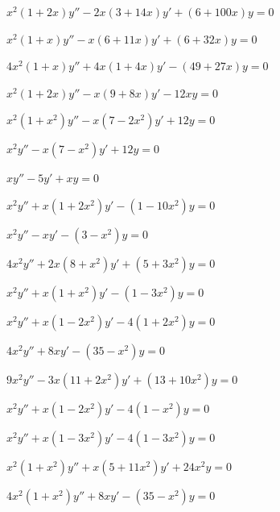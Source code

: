 \begin{exerciselist}
  \item\label{exer:7.7.19} $x^{2}(1+2x)y''-2x(3+14x)y'+(6+100x)y=0$

  \item\label{exer:7.7.20} $x^{2}(1+x)y''-x(6+11x)y'+(6+32x)y=0$

  \item\label{exer:7.7.21} $4x^{2}(1+x)y''+4x(1+4x)y'-(49+27x)y=0$

  \item\label{exer:7.7.22} $x^{2}(1+2x)y''-x(9+8x)y'-12xy=0$

  \item\label{exer:7.7.23} $x^{2}(1+x^{2})y''-x(7-2x^{2})y'+12y=0$

  \item\label{exer:7.7.24} $x^{2}y''-x(7-x^{2})y'+12y=0$

  \item\label{exer:7.7.25} $xy''-5y'+xy=0$

  \item\label{exer:7.7.26} $x^{2}y''+x(1+2x^{2})y'-(1-10x^{2})y=0$

  \item\label{exer:7.7.27} $x^{2}y''-xy'-(3-x^{2})y=0$

  \item\label{exer:7.7.28} $4x^{2}y''+2x(8+x^{2})y'+(5+3x^{2})y=0$

  \item\label{exer:7.7.29} $x^{2}y''+x(1+x^{2})y'-(1-3x^{2})y=0$

  \item\label{exer:7.7.30} $x^{2}y''+x(1-2x^{2})y'-4(1+2x^{2})y=0$

  \item\label{exer:7.7.31} $4x^{2}y''+8xy'-(35-x^{2})y=0$

  \item\label{exer:7.7.32} $9x^{2}y''-3x(11+2x^{2})y'+(13+10x^{2})y=0$

  \item\label{exer:7.7.33} $x^{2}y''+x(1-2x^{2})y'-4(1-x^{2})y=0$

  \item\label{exer:7.7.34} $x^{2}y''+x(1-3x^{2})y'-4(1-3x^{2})y=0$

  \item\label{exer:7.7.35} $x^{2}(1+x^{2})y''+x(5+11x^{2})y'+24x^{2}y=0$

  \item\label{exer:7.7.36} $4x^{2}(1+x^{2})y''+8xy'-(35-x^{2})y=0$


\end{exerciselist}
